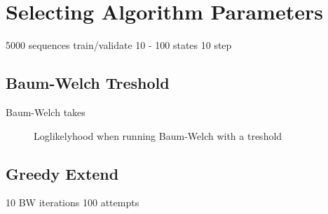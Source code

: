\section{Selecting Algorithm Parameters}
5000 sequences train/validate
10 - 100 states
10 step

\subsection{Baum-Welch Treshold}
Baum-Welch takes 

\begin{figure}
\caption{Loglikelyhood when running Baum-Welch with a treshold}
\label{fig:treshold}
\end{figure}

\subsection{Greedy Extend}
10 BW iterations
100 attempts